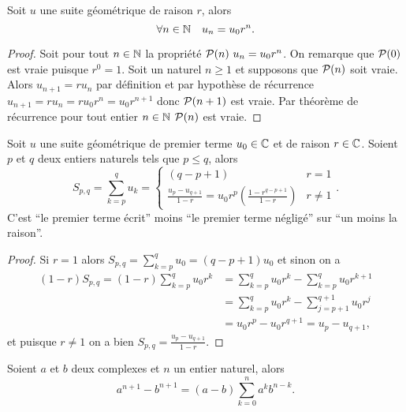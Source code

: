 \begin{prop}
  Soit $u$ une suite géométrique de raison $r$, alors
  \begin{equation}
    \forall n \in \N \quad u_n=u_0r^n.
  \end{equation}
\end{prop}
\begin{proof}
  Soit pour tout $n\in\N$ la propriété $\P(n)\ u_n=u_0r^n$. On remarque que $\P(0)$ est vraie puisque $r^0=1$. Soit un naturel $n\geqslant 1$ et supposons que $\P(n)$ soit vraie. Alors $u_{n+1}=r u_n$ par définition et par hypothèse de récurrence $u_{n+1}=r u_n = r u_0 r^n=u_0 r^{n+1}$ donc $\P(n+1)$ est vraie. Par théorème de récurrence pour tout entier $n\in\N$ $\P(n)$ est vraie.
\end{proof}
\begin{prop}
  Soit $u$ une suite géométrique de premier terme $u_0\in\C$ et de raison $r\in\C$. Soient $p$ et $q$ deux entiers naturels tels que $p\leqslant q$, alors
  \begin{equation}
    S_{p,q}=\sum_{k=p}^q u_k=
    \begin{cases}
      (q-p+1) & r=1 \\
      \frac{u_p-u_{q+1}}{1-r}=u_0r^p\left(\frac{1-r^{q-p+1}}{1-r}\right) & r \neq 1
    \end{cases}.
  \end{equation}
  C'est ``le premier terme écrit'' moins ``le premier terme négligé'' sur ``un moins la raison''.
\end{prop}
\begin{proof}
  Si $r=1$ alors $S_{p,q}=\sum_{k=p}^qu_0=(q-p+1)u_0$ et sinon on a
  \begin{align}
    (1-r)S_{p,q}=(1-r)\sum_{k=p}^q u_0r^k &= \sum_{k=p}^q u_0r^k - \sum_{k=p}^q u_0r^{k+1}\\
&=\sum_{k=p}^q u_0r^k - \sum_{j=p+1}^{q+1} u_0r^{j}\\
&=u_0 r^p -u_0 r^{q+1} = u_p-u_{q+1},
  \end{align}
et puisque $r\neq 1$ on a bien  $S_{p,q}=\frac{u_p-u_{q+1}}{1-r}$.
\end{proof}
\begin{prop}
  Soient $a$ et $b$ deux complexes et $n$ un entier naturel, alors
  \begin{equation}
    a^{n+1}-b^{n+1}=(a-b)\sum_{k=0}^n a^k b^{n-k}.
  \end{equation}
\end{prop}
